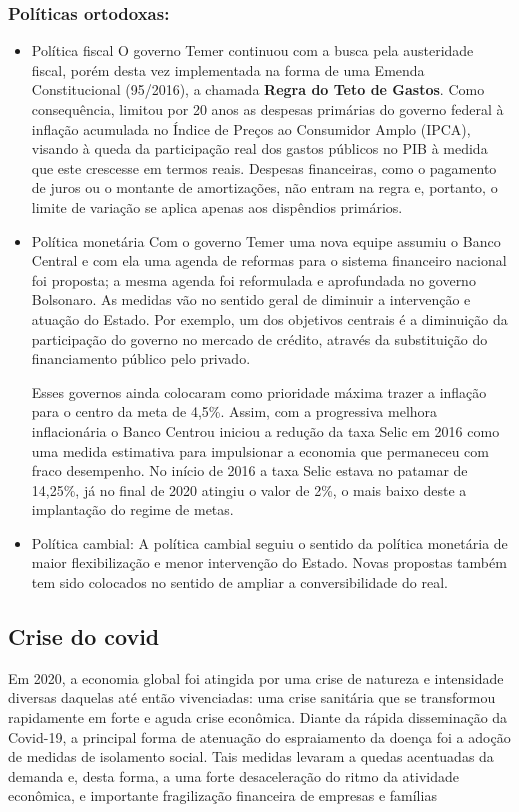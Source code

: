 \documentclass[11pt]{article}
\begin{document}
\subsubsection*{Políticas ortodoxas:}
\label{sec:org2d2b6e5}
\begin{itemize}
\item Política fiscal
\label{sec:orgcd2bfd7}
O governo Temer continuou com a busca pela austeridade fiscal, porém desta vez implementada na forma de uma Emenda Constitucional (95/2016), a chamada \textbf{Regra do Teto de Gastos}. Como consequência, limitou por 20 anos as despesas primárias do governo federal à inflação acumulada no Índice de Preços ao Consumidor Amplo (IPCA), visando à queda da participação real dos gastos públicos no PIB à medida que este crescesse em termos reais. Despesas financeiras, como o pagamento de juros ou o montante de amortizações, não entram na regra e, portanto, o limite de variação se aplica apenas aos dispêndios primários.

\item Política monetária
\label{sec:orgdc486a8}
Com o governo Temer uma nova equipe assumiu o Banco Central e com ela uma agenda de reformas para o sistema financeiro nacional foi proposta; a mesma agenda foi reformulada e aprofundada no governo Bolsonaro. As medidas vão no sentido geral de diminuir a intervenção e atuação do Estado. Por exemplo, um dos objetivos centrais é a diminuição da participação do governo no mercado de crédito, através da substituição do financiamento público pelo privado.

Esses governos ainda colocaram como prioridade máxima trazer a inflação para o centro da meta de 4,5\%.
Assim, com a progressiva melhora inflacionária o Banco Centrou iniciou a redução da taxa Selic em 2016 como uma medida estimativa para impulsionar a economia que permaneceu com fraco desempenho.  No início de 2016 a taxa Selic estava no patamar de 14,25\%, já no final de 2020 atingiu o valor de 2\%, o mais baixo deste a implantação do regime de metas.
\item Política cambial:
\label{sec:org37b7f6c}
A política cambial seguiu o sentido da política monetária de maior flexibilização e menor intervenção do Estado. Novas propostas também tem sido colocados no sentido de ampliar a conversibilidade do real.
\end{itemize}

\subsection*{Crise do covid}
\label{sec:org6fb8adf}
Em 2020, a economia global foi atingida por uma crise de natureza e intensidade diversas daquelas até então vivenciadas: uma crise sanitária que se transformou rapidamente em forte e aguda crise econômica. Diante da rápida disseminação da Covid-19, a principal forma de atenuação do espraiamento da doença foi a adoção de medidas de isolamento social. Tais medidas levaram a quedas acentuadas da demanda e, desta forma, a uma forte desaceleração do ritmo da atividade econômica, e importante fragilização financeira de empresas e famílias
\end{document}
